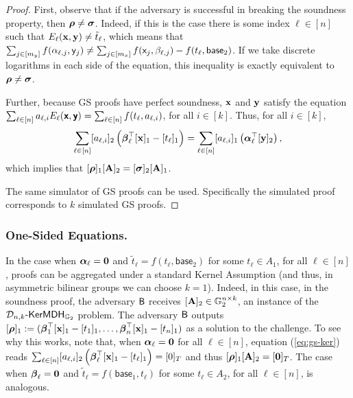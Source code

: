 \begin{proof}
First, observe that if the adversary is successful in breaking the soundness property, then ${\boldsymbol \rho} \neq {\boldsymbol \sigma}$. Indeed, 
if this is the case there is some index $\ell \in [n]$ such that 
$E_{\ell}(\mathbf{x},\mathbf{y}) \neq \tilde{t}_{\ell}$, which means that 
$\sum_{j\in[m_y]} f(\alpha_{\ell,j}, \mathsf{y}_j) \neq 
\sum_{j\in[m_x]}  f(\mathsf{x}_j, \beta_{\ell,j}) - f(t_{\ell},\mathsf{base}_{2})$.  
If we take discrete logarithms in each side of the equation, this inequality is exactly equivalent to
${\boldsymbol \rho} \neq {\boldsymbol \sigma}$.


Further, because GS proofs have perfect soundness, $\mathbf{x}$ and $\mathbf{y}$ satisfy 
the equation $\sum_{\ell\in[n]} a_{\ell,i} E_{\ell}(\textbf{\textsf{x}},\textbf{\textsf{y}})= \sum_{\ell \in [n]} f(t_{\ell}, a_{\ell,i})$, for all $i \in [k]$.
Thus, for all $i\in[k]$, 
\begin{equation}
\sum_{\ell\in[n]} [{a}_{\ell,i}]_2 \left({\boldsymbol \beta}_\ell^\top[\mathbf{x}]_1 - [{t}_{\ell}]_1 \right)  = \sum_{\ell \in [n]} [{a}_{\ell,i}]_1
\left({\boldsymbol \alpha}^\top_\ell[\mathbf{y}]_2\right),
\label{eq:gs-ker}
\end{equation}
which implies that $[{\boldsymbol \rho}]_1[\mathbf{{A}}]_2=[{\boldsymbol \sigma}]_2[\mathbf{{A}}]_1$.

  The same simulator of GS proofs can be used. Specifically
the simulated proof corresponds to $k$ simulated GS proofs.
\end{proof}

\subsubsection{One-Sided Equations.} In the case when ${\boldsymbol \alpha}_{\ell}=\mathbf{{0}}$ and $\tilde{t}_{\ell}=f(t_{\ell},\mathsf{base}_{2})$ for some $t_{\ell} \in A_1$, for all $\ell\in[n]$, proofs can be aggregated under a standard Kernel Assumption (and thus, in asymmetric bilinear groups we can choose $k=1$). Indeed, 
in this case, in the soundness proof, the adversary $\mathsf{B}$ receives $[\mathbf{{A}}]_2\in\mathbb{G}_2^{n\times k}$, an instance of the $\mathcal{D}_{n,k}\mbox{-}\mathsf{KerMDH}_{\mathbb{G}_2}$ problem. The adversary $\mathsf{B}$ outputs $[{\boldsymbol \rho}]_1:=({\boldsymbol \beta}_1^\top[\mathbf{x}]_1 -[{t}_{1}]_1,\ldots,
{\boldsymbol \beta}_{n}^\top[\mathbf{x}]_1 -[{t}_{n}]_1) $ as a solution to the challenge. To see why this works, note that, when ${\boldsymbol \alpha}_{\ell}=\mathbf{{0}}$ for all $\ell\in[n]$, equation (\ref{eq:gs-ker}) reads $\sum_{\ell\in[n]} [{a}_{\ell,i}]_2 \left({\boldsymbol \beta}_\ell^\top [\mathbf{x}]_1 - [{t}_{\ell}]_1 \right)  = [{0}]_T$ and thus $[{\boldsymbol \rho}]_1[\mathbf{{A}}]_2=[\mathbf{{0}}]_T$.  The case when ${\boldsymbol \beta}_\ell=\mathbf{{0}}$ and $\tilde{t}_{\ell}=f(\mathsf{base}_{1},t_{\ell})$ for some $t_{\ell} \in A_2$, for all $\ell\in[n]$, is analogous. 

